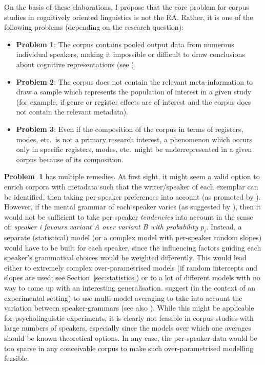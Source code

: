 On the basis of these elaborations, I propose that the core problem for corpus studies in cognitively oriented linguistics is not the RA.
Rather, it is one of the following problems (depending on the research question):

\vspace{\baselineskip}

\begin{itemize}
  \item\label{it:pooled} \textbf{Problem 1}: The corpus contains pooled output data from numerous individual speakers, making it impossible or difficult to draw conclusions about cognitive representations (see \citealt{Dabrowska2008,Dabrowska2012,Dabrowska2015}).
  \item\label{it:meta} \textbf{Problem 2}: The corpus does not contain the relevant meta-information to draw a sample which represents the population of interest in a given study (for example, if genre or register effects are of interest and the corpus does not contain the relevant metadata).
  \item\label{it:composition} \textbf{Problem 3}: Even if the composition of the corpus in terms of registers, modes, etc.\ is not a primary research interest, a phenomenon which occurs only in specific registers, modes, etc.\ might be underrepresented in a given corpus because of its composition.
\end{itemize}

\vspace{\baselineskip}

\textbf{Problem~1} has multiple remedies.
At first sight, it might seem a valid option to enrich corpora with metadata such that the writer\slash speaker of each exemplar can be identified, then taking per-speaker preferences into account (as promoted by \citealt{Gries2015,Gries2017a}).
However, if the mental grammar of each speaker varies (as suggested by \citealt{Dabrowska2008,Dabrowska2012,Dabrowska2015}), then it would not be sufficient to take per-speaker \textit{tendencies} into account in the sense of: \textit{speaker i favours variant A over variant B with probability $p_i$}.
Instead, a separate (statistical) model (or a complex model with per-speaker random slopes) would have to be built for each speaker, since the influencing factors guiding each speaker's grammatical choices would be weighted differently.
This would lead either to extremely complex over-parametrised models (if random intercepts and slopes are used; see Section~\ref{sec:statistics}) or to a lot of different models with no way to come up with an interesting generalisation.
\citet{KupermanBresnan2012} suggest (in the context of an experimental setting) to use multi-model averaging \citep{BurnhamAnderson2002} to take into account the variation between speaker-grammars (see also \citealt{BarthKapatsinski2014}).
While this might be applicable for psycholinguistic experiments, it is clearly not feasible in corpus studies with large numbers of speakers, especially since the models over which one averages should be known theoretical options.
In any case, the per-speaker data would be too sparse in any conceivable corpus to make such over-parametrised modelling feasible.

